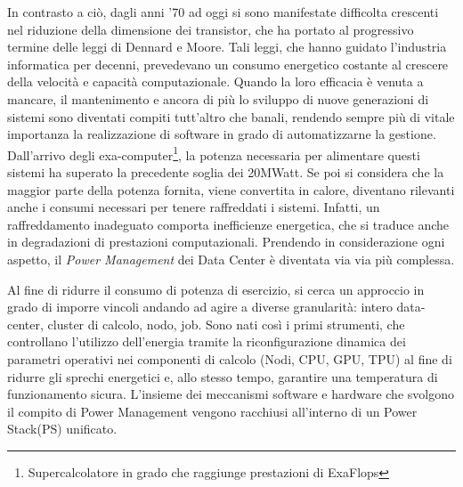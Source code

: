 In contrasto a ciò, dagli anni '70 ad oggi si sono manifestate difficolta crescenti nel riduzione della dimensione dei transistor, che ha portato al progressivo termine delle leggi di Dennard e Moore\cite{Dennardsscaling}\cite{Dennardsscaling2}. Tali leggi, che hanno guidato l'industria informatica per decenni, prevedevano un consumo energetico costante al crescere della velocità e capacità computazionale. Quando la loro efficacia è venuta a mancare, il mantenimento e ancora di più lo sviluppo di nuove generazioni di sistemi sono diventati compiti tutt'altro che banali\cite{growth}, rendendo sempre più di vitale importanza la realizzazione di software in grado di automatizzarne la gestione.
Dall'arrivo degli exa-computer\footnote{Supercalcolatore in grado che raggiunge prestazioni di ExaFlops}, la potenza necessaria per alimentare questi sistemi ha superato la precedente soglia dei 20MWatt\cite{TOP500}. Se poi si considera che la maggior parte della potenza fornita, viene convertita in calore, diventano rilevanti anche i consumi necessari per tenere raffreddati i sistemi. Infatti, un raffreddamento inadeguato comporta inefficienze energetica, che si traduce anche in degradazioni di prestazioni computazionali. Prendendo in considerazione ogni aspetto, il \emph{Power Management} dei Data Center è diventata via via più complessa. %

Al fine di ridurre il consumo di potenza di esercizio, si cerca un approccio in grado di imporre vincoli andando ad agire a diverse granularità: intero data-center, cluster di calcolo, nodo, job. 
Sono nati così i primi strumenti, che controllano l'utilizzo dell'energia tramite la riconfigurazione dinamica dei parametri operativi nei componenti di calcolo (Nodi, CPU, GPU, TPU) al fine di ridurre gli sprechi energetici e, allo stesso tempo, garantire una temperatura di funzionamento sicura. %
L'insieme dei meccanismi software e hardware che svolgono il compito di Power Management vengono racchiusi all'interno di un Power Stack(PS) unificato. %


